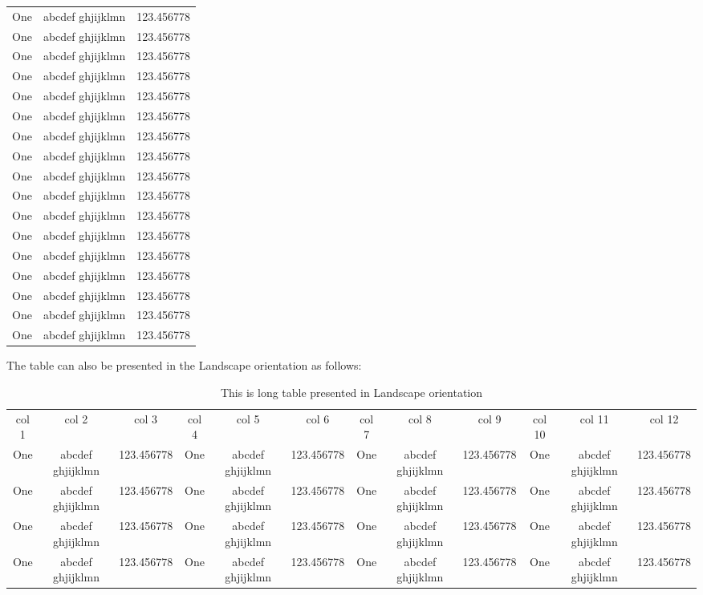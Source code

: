 \begin{longtable}{|l|l|l|}
	One & abcdef ghjijklmn & 123.456778 \\
	One & abcdef ghjijklmn & 123.456778 \\
	One & abcdef ghjijklmn & 123.456778 \\
	One & abcdef ghjijklmn & 123.456778 \\
	One & abcdef ghjijklmn & 123.456778 \\
	One & abcdef ghjijklmn & 123.456778 \\
	One & abcdef ghjijklmn & 123.456778 \\
	One & abcdef ghjijklmn & 123.456778 \\
	One & abcdef ghjijklmn & 123.456778 \\
	One & abcdef ghjijklmn & 123.456778 \\
	One & abcdef ghjijklmn & 123.456778 \\
	One & abcdef ghjijklmn & 123.456778 \\
	One & abcdef ghjijklmn & 123.456778 \\
	One & abcdef ghjijklmn & 123.456778 \\
	One & abcdef ghjijklmn & 123.456778 \\
	One & abcdef ghjijklmn & 123.456778 \\
	One & abcdef ghjijklmn & 123.456778 \\
\end{longtable}

The table can also be presented in the Landscape orientation as follows: 
\begin{table}
	\centering
	\caption{This is long table presented in Landscape orientation}
	\begin{tabular}{|c|c|c|c|c|c|c|c|c|c|c|c}
		\hline
		col 1 & col 2 & col 3 & col 4 & col 5 & col 6 & col 7 & col 8 & col 9 & col 10 & col 11 & col 12 \\
		One & abcdef ghjijklmn & 123.456778 & One & abcdef ghjijklmn & 123.456778 & One & abcdef ghjijklmn & 123.456778 & One & abcdef ghjijklmn &  123.456778 \\
		One & abcdef ghjijklmn & 123.456778 & One & abcdef ghjijklmn & 123.456778 & One & abcdef ghjijklmn & 123.456778 & One & abcdef ghjijklmn &  123.456778 \\
		One & abcdef ghjijklmn & 123.456778 & One & abcdef ghjijklmn & 123.456778 & One & abcdef ghjijklmn & 123.456778 & One & abcdef ghjijklmn &  123.456778 \\
		One & abcdef ghjijklmn & 123.456778 & One & abcdef ghjijklmn & 123.456778 & One & abcdef ghjijklmn & 123.456778 & One & abcdef ghjijklmn &  123.456778 \\
		\hline
	\end{tabular}
\end{table}	


